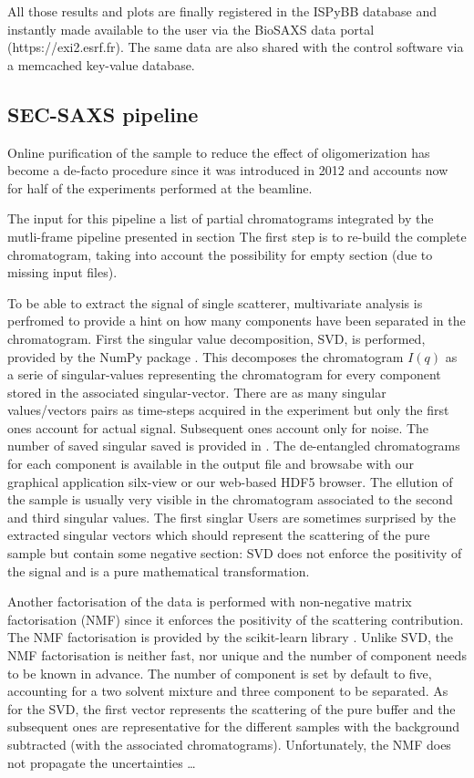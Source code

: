 \documentclass[preprint]{iucr}              %
\begin{document}
All those results and plots are finally registered in the ISPyBB database and instantly made available to the user via
the BioSAXS data portal (https://exi2.esrf.fr). 
The same data are also shared with the control software via a memcached key-value database.  
       

\subsection{SEC-SAXS pipeline}
Online purification of the sample to reduce the effect of oligomerization has become a de-facto procedure
since it was introduced in 2012 \cite{SECPaper2012} and accounts now for half of the experiments performed at the beamline.

The input for this pipeline a list of partial chromatograms integrated by the mutli-frame pipeline presented in section {}
The first step is to re-build the complete chromatogram, taking into account the possibility for empty section (due to missing input files).

To be able to extract the signal of single scatterer, multivariate analysis is perfromed to provide a hint on how many components
have been separated in the chromatogram. 
First the singular value decomposition, SVD, is performed, provided by the NumPy package \cite{numpy}.
This decomposes the chromatogram $I(q)$ as a serie of singular-values representing the chromatogram for every component stored in the
associated singular-vector. 
There are as many singular values/vectors pairs as time-steps acquired in the experiment but only the first ones account for actual signal.
Subsequent ones account only for noise. 
The number of saved singular saved is provided in \cite{svd_threshold}.
The de-entangled chromatograms for each component is available in the output file and browsabe with our graphical application silx-view or our web-based HDF5 browser.
The ellution of the sample is usually very visible in the chromatogram associated to the second and third singular values.
The first singlar  
Users are sometimes surprised by the extracted singular vectors which should represent the scattering of the pure sample 
but contain some negative section: SVD does not enforce the positivity of the signal and is a pure mathematical transformation.

Another factorisation of the data is performed with non-negative matrix factorisation (NMF) since it enforces the positivity
of the scattering contribution. 
The NMF factorisation is provided by the scikit-learn library \cite{sklearn}.
Unlike SVD, the NMF factorisation is neither fast, nor unique and the number of component needs to be known in advance.
The number of component is set by default to five, accounting for a two solvent mixture and three component to be separated.   
As for the SVD, the first vector represents the scattering of the pure buffer and the subsequent ones 
are representative for the different samples with the background subtracted (with the associated chromatograms).
Unfortunately, the NMF does not propagate the uncertainties \ldots
\end{document}
